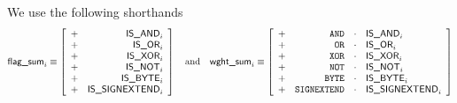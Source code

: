 We use the following shorthands
\[
	\textsf{flag\_sum}_{i}
	\equiv
	\left[ \begin{array}{cr}
		+ & \textsf{IS\_AND}            _{i}   \\
		+ & \textsf{IS\_OR}             _{i}   \\
		+ & \textsf{IS\_XOR}            _{i}   \\
		+ & \textsf{IS\_NOT}            _{i}   \\
		+ & \textsf{IS\_BYTE}           _{i}   \\
		+ & \textsf{IS\_SIGNEXTEND}     _{i}   \\
	\end{array} \right]
	\quad\text{and}\quad
	\textsf{wght\_sum}_{i}
	\equiv
	\left[ \begin{array}{crcl}
		+ & \texttt{AND}            & \cdot & \textsf{IS\_AND}         _{i}   \\
		+ & \texttt{OR}             & \cdot & \textsf{IS\_OR}          _{i}   \\
		+ & \texttt{XOR}            & \cdot & \textsf{IS\_XOR}         _{i}   \\
		+ & \texttt{NOT}            & \cdot & \textsf{IS\_NOT}         _{i}   \\
		+ & \texttt{BYTE}           & \cdot & \textsf{IS\_BYTE}        _{i}   \\
		+ & \texttt{SIGNEXTEND}     & \cdot & \textsf{IS\_SIGNEXTEND}  _{i}   \\
	\end{array} \right]
\]
